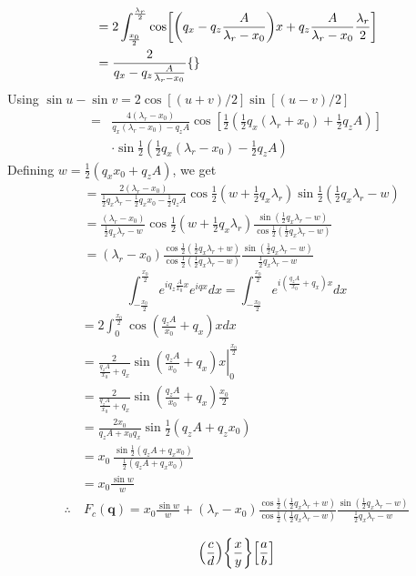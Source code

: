 \documentclass[letterpage]{article}
\begin{document}
\begin{align}
  & =2\int_{\frac{x_0}{2}}^{\frac{\lambda_r}{2}}   
     \cos\mathopen{}\left[ \mathopen{}\left( q_x-q_z\frac{A}{\lambda_r-x_0} \right)\mathclose{}x
     + q_z\frac{A}{\lambda_r-x_0}\frac{\lambda_r}{2} \right]\mathclose{} \\
  & =\frac{2}{q_x-q_z\frac{A}{\lambda_r-x_0}} 
     \mathopen{}\left\lbrace  \right\rbrace\mathclose{}
\end{align}
Using $\sin u-\sin v = 2\cos[(u+v)/2]\sin[(u-v)/2]$
\begin{align}
  =& \frac{4(\lambda_r-x_0)}{q_x(\lambda_r-x_0)-q_zA}
    \cos\left[\frac{1}{2} \left(\frac{1}{2}q_x (\lambda_r + x_0)
  + \frac{1}{2} q_zA \right)\right]\\
  & \cdot \sin \frac{1}{2} \left(\frac{1}{2}q_x(\lambda_r-x_0)
  -\frac{1}{2}q_zA\right)
\end{align}
Defining $w = \frac{1}{2} \left(q_xx_0 + q_z A \right)$, we get
\begin{align}
  & =\frac{2(\lambda_r-x_0)}{\frac{1}{2}q_x \lambda_r - \frac{1}{2}q_x x_0
    -\frac{1}{2} q_z A} \cos \frac{1}{2} \left(w + \frac{1}{2}q_x 
    \lambda_r \right) \sin \frac{1}{2} \left(\frac{1}{2} q_x \lambda_r-w \right)\\
  & =\frac{(\lambda_r-x_0)}{\frac{1}{2}q_x \lambda_r - w} \cos \frac{1}{2}
    \left(w + \frac{1}{2}q_x \lambda_r \right) 
    \frac{\sin\left(\frac{1}{2}q_x \lambda_r - w \right)}
    {\cos\frac{1}{2}\left(\frac{1}{2}q_x \lambda_r -w \right)}\\
  & =(\lambda_r - x_0) \frac{\cos\frac{1}{2}\left(\frac{1}{2}q_x \lambda_r
    + w \right)}{\cos\frac{1}{2} \left(\frac{1}{2} q_x \lambda_r - w \right)}
    \frac{\sin \left(\frac{1}{2}q_x \lambda_r - w \right)}{\frac{1}{2}
    q_x \lambda_r - w}
\end{align}
\begin{equation}
  \int_{-\frac{x_0}{2}}^{\frac{x_0}{2}} e^{iq_z \frac{A}{x_0}x}
    e^{iqx}dx = \int_{-\frac{x_0}{2}}^{\frac{x_0}{2}}
    e^{i\left(\frac{q_zA}{x_0} + q_x \right)x}dx
\end{equation}
\begin{align}
  & =2 \int_{0}^{\frac{x_0}{2}} \cos \left(\frac{q_zA}{x_0} + q_x \right)xdx\\
  & =\frac{2}{\frac{q_zA}{x_0} + q_x}
    \sin\left.\left(\frac{q_zA}{x_0} + q_x \right) x \right|_{0}^{\frac{x_0}{2}}\\
  & =\frac{2}{\frac{q_zA}{x_0}+q_x} \sin \left(\frac{q_zA}{x_0}+q_x \right)
    \frac{x_0}{2}\\
  & =\frac{2x_0}{q_zA + x_0 q_x} \sin \frac{1}{2} (q_zA + q_z x_0)\\
  & =x_0 \: \frac{\sin\frac{1}{2}\left(q_zA + q_x x_0 \right)}
    {\frac{1}{2}\left(q_zA + q_x x_0 \right)}\\
  &= x_0 \frac{\sin w}{w}\\
  \therefore & \: F_c(\textbf{q}) = x_0 \frac{\sin w}{w} + (\lambda_r - x_0)
    \frac{\cos\frac{1}{2}\left(\frac{1}{2} q_x \lambda_r + w\right)}
    {\cos\frac{1}{2} \left(\frac{1}{2}q_x \lambda_r - w \right)}
    \frac{\sin\left(\frac{1}{2}q_x \lambda_r - w \right)}
    {\frac{1}{2}q_x \lambda_r - w}
\end{align}

\begin{equation}
  \mathopen{}\left( \frac{c}{d} \right)\mathclose{}
  \mathopen{}\left\lbrace \frac{x}{y} \right\rbrace\mathclose{}
  \mathopen{}\left[ \frac{a}{b} \right]\mathclose{}
\end{equation}
\end{document}
